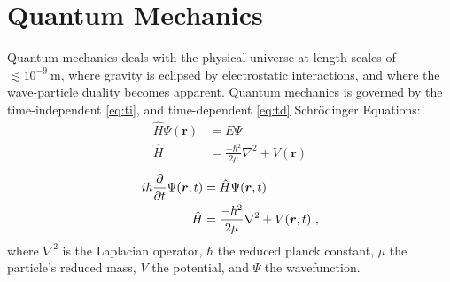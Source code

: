 \section{Quantum Mechanics}\label{s:qm}
%
Quantum mechanics deals with the physical universe at length scales of $ \lesssim 10^{-9}~\text{m} $, where gravity is eclipsed by electrostatic interactions, and where the wave-particle duality becomes apparent. Quantum mechanics is governed by the time-independent \cref{eq:ti}, and time-dependent \cref{eq:td} Schrödinger Equations:
\begin{subequations}\label{eq:ti}
\begin{align}
\hat{H} \Psi(\bm{r}) &= E \Psi\\
\hat{H} &= \frac{-\hbar^{2}}{2\mu}\nabla^{2} + V(\bm{r})
\end{align}
\end{subequations}
%
\begin{subequations}\label{eq:td}
\begin{align}
i\hbar\frac{\partial }{\partial t}\Psi(\bm{r},t) &= \hat{H}\Psi(\bm{r},t)\\
\hat{H} &= \frac{-\hbar^{2}}{2\mu}\nabla^{2} + V(\bm{r},t)~,
\end{align}
\end{subequations}
where $ \nabla^{2} $ is the Laplacian operator, $ \hbar $ the reduced planck constant, $ \mu $ the particle's reduced mass, $ V $ the potential, and $ \Psi $ the wavefunction.

